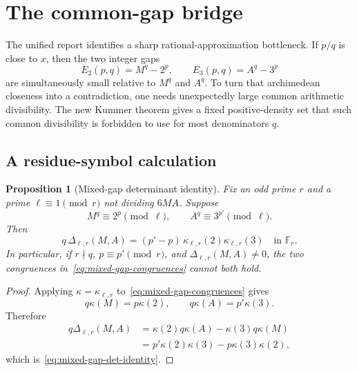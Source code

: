 \documentclass[11pt,oneside]{article}
\newtheorem{proposition}[theorem]{Proposition}
\theoremstyle{definition}
\theoremstyle{remark}
\newcommand{\F}{\mathbb F}
\begin{document}
\section{The common-gap bridge}
\label{sec:common-gap}

The unified report identifies a sharp rational-approximation bottleneck.  If $p/q$ is close
to $x$, then the two integer gaps
\begin{equation}
 E_2(p,q)=M^q-2^p,
 \qquad
 E_3(p,q)=A^q-3^p
 \label{eq:common-gaps}
\end{equation}
are simultaneously small relative to $M^q$ and $A^q$.  To turn that archimedean closeness
into a contradiction, one needs unexpectedly large common arithmetic divisibility.  The new
Kummer theorem gives a fixed positive-density set that such common divisibility is forbidden
to use for most denominators $q$.

\subsection{A residue-symbol calculation}

\begin{proposition}[Mixed-gap determinant identity]
\label{prop:mixed-gap-det}
Fix an odd prime $r$ and a prime $\ell\equiv1\pmod r$ not dividing $6MA$.  Suppose
\begin{equation}
 M^q\equiv2^p\pmod\ell,
 \qquad
 A^q\equiv3^{p'}\pmod\ell.
 \label{eq:mixed-gap-congruences}
\end{equation}
Then
\begin{equation}
 q\,\Delta_{\ell,r}(M,A)
 =(p'-p)\,\kappa_{\ell,r}(2)\kappa_{\ell,r}(3)
 \quad\text{in }\F_r.
 \label{eq:mixed-gap-det-identity}
\end{equation}
In particular, if $r\nmid q$, $p\equiv p'\pmod r$, and
$\Delta_{\ell,r}(M,A)\ne0$, the two congruences in~\eqref{eq:mixed-gap-congruences} cannot
both hold.
\end{proposition}

\begin{proof}
Applying $\kappa=\kappa_{\ell,r}$ to~\eqref{eq:mixed-gap-congruences} gives
\[
 q\kappa(M)=p\kappa(2),
 \qquad
 q\kappa(A)=p'\kappa(3).
\]
Therefore
\begin{align*}
 q\Delta_{\ell,r}(M,A)
 &=\kappa(2)q\kappa(A)-\kappa(3)q\kappa(M)\\
 &=p'\kappa(2)\kappa(3)-p\kappa(3)\kappa(2),
\end{align*}
which is~\eqref{eq:mixed-gap-det-identity}.
\end{proof}
\end{document}
